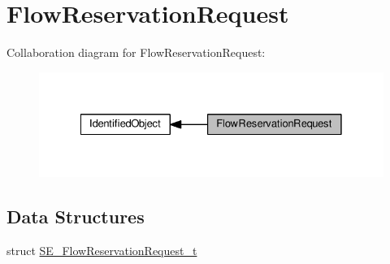 \hypertarget{group__FlowReservationRequest}{}\section{Flow\+Reservation\+Request}
\label{group__FlowReservationRequest}
Collaboration diagram for Flow\+Reservation\+Request\+:\nopagebreak
\begin{figure}[H]
\begin{center}
\leavevmode
\includegraphics[width=328pt]{group__FlowReservationRequest}
\end{center}
\end{figure}
\subsection*{Data Structures}
\begin{DoxyCompactItemize}
\item 
struct \hyperlink{structSE__FlowReservationRequest__t}{S\+E\+\_\+\+Flow\+Reservation\+Request\+\_\+t}
\end{DoxyCompactItemize}
